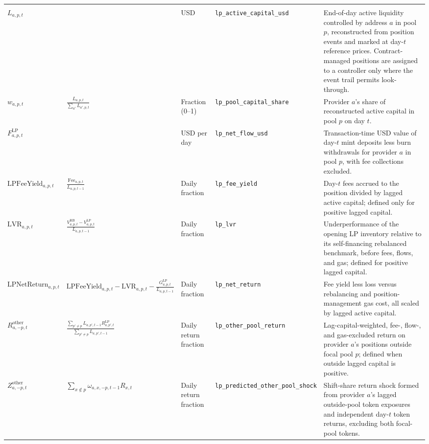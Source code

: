 \begin{tabularx}{\linewidth}{@{}>{\raggedright\arraybackslash}X>{\raggedright\arraybackslash}Xl>{\raggedright\arraybackslash}X>{\raggedright\arraybackslash}X@{}}
\addlinespace
\multicolumn{5}{@{}l}{\textit{LP capital and return measures}} \\
$L_{a,p,t}$ &  & USD & \texttt{lp\_\allowbreak{}active\_\allowbreak{}capital\_\allowbreak{}usd} & End-of-day active liquidity controlled by address $a$ in pool $p$, reconstructed from position events and marked at day-$t$ reference prices. Contract-managed positions are assigned to a controller only where the event trail permits look-through. \\
$w_{a,p,t}$ & $\displaystyle\frac{L_{a,p,t}}{\sum_{a'}L_{a',p,t}}$ & Fraction (0--1) & \texttt{lp\_\allowbreak{}pool\_\allowbreak{}capital\_\allowbreak{}share} & Provider $a$'s share of reconstructed active capital in pool $p$ on day $t$. \\
$F^{\mathrm{LP}}_{a,p,t}$ &  & USD per day & \texttt{lp\_\allowbreak{}net\_\allowbreak{}flow\_\allowbreak{}usd} & Transaction-time USD value of day-$t$ mint deposits less burn withdrawals for provider $a$ in pool $p$, with fee collections excluded. \\
$\mathrm{LPFeeYield}_{a,p,t}$ & $\displaystyle\frac{\mathrm{Fee}_{a,p,t}}{L_{a,p,t-1}}$ & Daily fraction & \texttt{lp\_\allowbreak{}fee\_\allowbreak{}yield} & Day-$t$ fees accrued to the position divided by lagged active capital; defined only for positive lagged capital. \\
$\mathrm{LVR}_{a,p,t}$ & $\displaystyle\frac{V^{\mathrm{RB}}_{a,p,t}-V^{\mathrm{LP}}_{a,p,t}}{L_{a,p,t-1}}$ & Daily fraction & \texttt{lp\_\allowbreak{}lvr} & Underperformance of the opening LP inventory relative to its self-financing rebalanced benchmark, before fees, flows, and gas; defined for positive lagged capital. \\
$\mathrm{LPNetReturn}_{a,p,t}$ & $\displaystyle\mathrm{LPFeeYield}_{a,p,t}-\mathrm{LVR}_{a,p,t}-\frac{G^{\mathrm{LP}}_{a,p,t}}{L_{a,p,t-1}}$ & Daily fraction & \texttt{lp\_\allowbreak{}net\_\allowbreak{}return} & Fee yield less loss versus rebalancing and position-management gas cost, all scaled by lagged active capital. \\
$R^{\mathrm{other}}_{a,-p,t}$ & $\displaystyle\frac{\sum_{p'\ne p}L_{a,p',t-1}R^{\mathrm{LP}}_{a,p',t}}{\sum_{p'\ne p}L_{a,p',t-1}}$ & Daily return fraction & \texttt{lp\_\allowbreak{}other\_\allowbreak{}pool\_\allowbreak{}return} & Lag-capital-weighted, fee-, flow-, and gas-excluded return on provider $a$'s positions outside focal pool $p$; defined when outside lagged capital is positive. \\
$Z^{\mathrm{other}}_{a,-p,t}$ & $\displaystyle\sum_{x\notin p}\omega_{a,x,-p,t-1}R_{x,t}$ & Daily return fraction & \texttt{lp\_\allowbreak{}predicted\_\allowbreak{}other\_\allowbreak{}pool\_\allowbreak{}shock} & Shift-share return shock formed from provider $a$'s lagged outside-pool token exposures and independent day-$t$ token returns, excluding both focal-pool tokens. \\

\end{tabularx}
